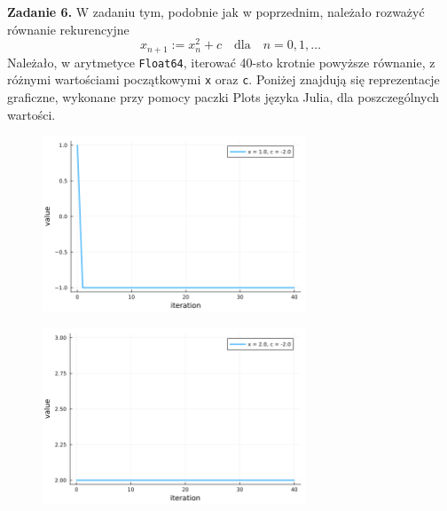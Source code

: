 \documentclass[15pt, a4paper]{article}
\begin{document}
\vspace{0.5cm}

\pagebreak

\noindent\hrulefill

 
\vspace{0.5cm}

\noindent\textbf{Zadanie 6.} W zadaniu tym, podobnie jak w poprzednim, należało rozważyć równanie rekurencyjne  
\[
    x_{n+1} := x_n^2 + c \quad \mathrm{dla} \quad n = 0, 1, \ldots
\]
Należało, w arytmetyce \verb|Float64|, iterować 40-sto krotnie powyższe równanie, z różnymi wartościami początkowymi \verb|x| oraz \verb|c|. Poniżej znajdują się reprezentacje graficzne, wykonane przy pomocy paczki Plots języka Julia, dla poszczególnych wartości.

\vspace{0.5cm}

\begin{figure}[h]
    \centering
    \includegraphics[width=0.7\textwidth]{img/6_1_plot.png}
\end{figure}

\begin{figure}[h]
    \centering
    \includegraphics[width=0.7\textwidth]{img/6_2_plot.png}
\end{figure}
\end{document}

